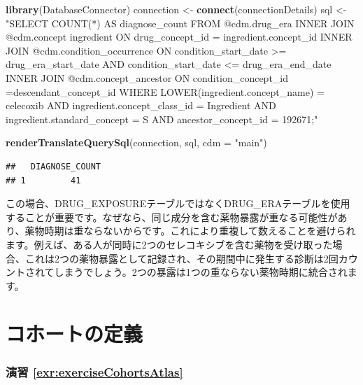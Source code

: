 \documentclass[
  11pt]{book}
\newenvironment{Shaded}{\begin{snugshade}}{\end{snugshade}}
\newcommand{\AttributeTok}[1]{\textcolor[rgb]{0.13,0.29,0.53}{#1}}
\newcommand{\FunctionTok}[1]{\textcolor[rgb]{0.13,0.29,0.53}{\textbf{#1}}}
\newcommand{\NormalTok}[1]{#1}
\newcommand{\OtherTok}[1]{\textcolor[rgb]{0.56,0.35,0.01}{#1}}
\newcommand{\StringTok}[1]{\textcolor[rgb]{0.31,0.60,0.02}{#1}}
\theoremstyle{definition}
\theoremstyle{definition}
\theoremstyle{definition}
\theoremstyle{definition}
\theoremstyle{remark}
\begin{document}
\begin{Shaded}
\begin{Highlighting}[]
\FunctionTok{library}\NormalTok{(DatabaseConnector)}
\NormalTok{connection }\OtherTok{\textless{}{-}} \FunctionTok{connect}\NormalTok{(connectionDetails)}
\NormalTok{sql }\OtherTok{\textless{}{-}} \StringTok{"SELECT COUNT(*) AS diagnose\_count}
\StringTok{FROM @cdm.drug\_era}
\StringTok{INNER JOIN @cdm.concept ingredient}
\StringTok{  ON drug\_concept\_id = ingredient.concept\_id}
\StringTok{INNER JOIN @cdm.condition\_occurrence}
\StringTok{  ON condition\_start\_date \textgreater{}= drug\_era\_start\_date}
\StringTok{    AND condition\_start\_date \textless{}= drug\_era\_end\_date}
\StringTok{INNER JOIN @cdm.concept\_ancestor}
\StringTok{  ON condition\_concept\_id =descendant\_concept\_id}
\StringTok{WHERE LOWER(ingredient.concept\_name) = \textquotesingle{}celecoxib\textquotesingle{}}
\StringTok{  AND ingredient.concept\_class\_id = \textquotesingle{}Ingredient\textquotesingle{}}
\StringTok{  AND ingredient.standard\_concept = \textquotesingle{}S\textquotesingle{}}
\StringTok{  AND ancestor\_concept\_id = 192671;"}

\FunctionTok{renderTranslateQuerySql}\NormalTok{(connection, sql, }\AttributeTok{cdm =} \StringTok{"main"}\NormalTok{)}
\end{Highlighting}
\end{Shaded}

\begin{verbatim}
##   DIAGNOSE_COUNT
## 1         41
\end{verbatim}

この場合、DRUG\_EXPOSUREテーブルではなくDRUG\_ERAテーブルを使用することが重要です。なぜなら、同じ成分を含む薬物暴露が重なる可能性があり、薬物時期は重ならないからです。これにより重複して数えることを避けられます。例えば、ある人が同時に2つのセレコキシブを含む薬物を受け取った場合、これは2つの薬物暴露として記録され、その期間中に発生する診断は2回カウントされてしまうでしょう。2つの暴露は1つの重ならない薬物時期に統合されます。

\section{コホートの定義}\label{Cohortsanswers}

\subsubsection*{演習 \ref{exr:exerciseCohortsAtlas}}\label{ux6f14ux7fd2-refexrexercisecohortsatlas}
\end{document}
